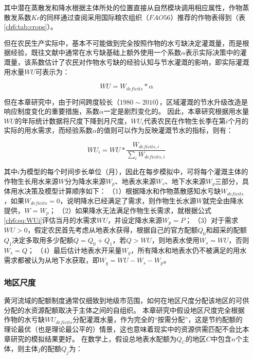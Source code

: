 其中潜在蒸散发和降水根据主体所处的位置直接从自然模块调用相应属性，作物蒸散发系数$Kc$的同样通过查阅采用国际粮农组织（$FAO56$）推荐的作物表得到（表\ref{ch6:tab:crops}）。



但在农民生产实际中，基本不可能做到完全按照作物的水亏缺决定灌溉量，而是根据经验，既往文献中通常在水亏缺基础上额外使用一个系数$\alpha$表示实际决策中的灌溉量，该系数估计了农民对作物水亏缺的经验认知与节水灌溉的影响，即实际灌溉用水量$WU$可表示为：

\begin{equation}
    \label{ch6:eq:WU}
    WU = W_{deficits} * \alpha
\end{equation}

但在本章研究中，由于时间跨度较长（$1980 \sim 2010$），区域灌溉的节水升级改造是响应制度变化的重要措施，系数$\alpha$一定是剧烈变化的。
因此，本章研究根据用水量$WU$的年际统计数据将尺度下降到月尺度，$WU_i$代表农民在作物生长季在第$i$个月的实际的用水需求，而经验系数$\alpha$的值则可以作为反映灌溉节水的指标，则有：

\begin{equation}
    \label{ch6:eq:WUi}
    WU_i = WU * \frac{W_{deficits, i}}{\sum_{i} W_{deficits, i}}
\end{equation}

其中$i$为模型的每个时间步长单位（月），因此在每步模拟中，可将每个灌溉主体的作物生长用水来源$W$分为降水来源$W_p$、地表水来源$W_s$、地下水来源$W_g$三部分，具体用水决策及模型计算顺序如下：
（1）根据降水和作物蒸散感知水亏缺$W_{deficits}$，如果$W_{deficits}=0$，说明降水已经满足了需求，则作物生长水源$W$就完全由降水提供，$W=W_{p}$；
（2）如果降水无法满足作物生长需求，就根据公式\ref{ch6:eq:WUi}评估当月的水需求$WU$，并设定降水来源$W_{p} = P$；
（3）对于需求$WU > 0$，假定农民首先考虑从地表水获得，根据自己的官方配额$Q_{0}$和超采的配额$Q_{1}$决定多取用多少配额$Q = Q_{0} + Q_{1}$，若$Q > WU$，则地表水使用$W_s = WU$，否则$W_s = Q$；
（4）最后估计地表水开采量$W_g$，所有降水和地表水仍不被满足的用水需求都被认为从地下水获取，即$W_g = WU - W_s - W_p$。

\subsubsection*{地区尺度}

黄河流域的配额制度通常仅细致到地级市范围，如何在地区尺度分配该地区的可供分配的水资源配额取决于主体之间的自组织。
本章研究中假设地区尺度完全根据作物的水亏缺$WU_{deficits}$分配灌溉水量，作为完全的“按需分配”，这是节约配额的理论最优（也是理论最公平的）情景，这也意味着现实中的资源供需匹配不会比本章研究的模拟结果更好。
在数学上，假设总地表水配额为$Q_{C}$的地区$C$中包含$n$个主体，则主体$j$的配额$Q_j$为：

